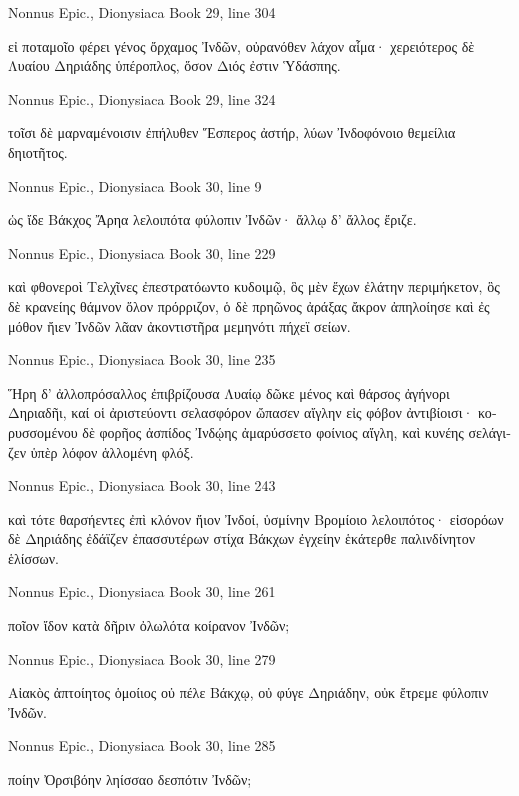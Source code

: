 \documentclass[12pt,letterpaper,twoside,final]{memoir}
\begin{document}
\begin{greek}
Nonnus Epic., Dionysiaca 
Book 29, line 304

                εἰ ποταμοῖο φέρει γένος ὄρχαμος Ἰνδῶν, 
οὐρανόθεν λάχον αἷμα· χερειότερος δὲ Λυαίου 
Δηριάδης ὑπέροπλος, ὅσον Διός ἐστιν Ὑδάσπης. 



Nonnus Epic., Dionysiaca 
Book 29, line 324

τοῖσι δὲ μαρναμένοισιν ἐπήλυθεν Ἕσπερος ἀστήρ, 
λύων Ἰνδοφόνοιο θεμείλια δηιοτῆτος. 



Nonnus Epic., Dionysiaca 
Book 30, line 9

ὡς ἴδε Βάκχος Ἄρηα λελοιπότα φύλοπιν Ἰνδῶν· 
ἄλλῳ δ' ἄλλος ἔριζε. 



Nonnus Epic., Dionysiaca 
Book 30, line 229

καὶ φθονεροὶ Τελχῖνες ἐπεστρατόωντο κυδοιμῷ, 
ὃς μὲν ἔχων ἐλάτην περιμήκετον, ὃς δὲ κρανείης 
θάμνον ὅλον πρόρριζον, ὁ δὲ πρηῶνος ἀράξας 
ἄκρον ἀπηλοίησε καὶ ἐς μόθον ἤιεν Ἰνδῶν 
λᾶαν ἀκοντιστῆρα μεμηνότι πήχεϊ σείων. 



Nonnus Epic., Dionysiaca 
Book 30, line 235

Ἥρη δ' ἀλλοπρόσαλλος ἐπιβρίζουσα Λυαίῳ 
δῶκε μένος καὶ θάρσος ἀγήνορι Δηριαδῆι, 
καί οἱ ἀριστεύοντι σελασφόρον ὤπασεν αἴγλην 
εἰς φόβον ἀντιβίοισι· κορυσσομένου δὲ φορῆος 
ἀσπίδος Ἰνδῴης ἀμαρύσσετο φοίνιος αἴγλη, 
καὶ κυνέης σελάγιζεν ὑπὲρ λόφον ἁλλομένη φλόξ. 



Nonnus Epic., Dionysiaca 
Book 30, line 243

καὶ τότε θαρσήεντες ἐπὶ κλόνον ἤιον Ἰνδοί, 
ὑσμίνην Βρομίοιο λελοιπότος· εἰσορόων δὲ 
Δηριάδης ἐδάϊζεν ἐπασσυτέρων στίχα Βάκχων 
ἐγχείην ἑκάτερθε παλινδίνητον ἑλίσσων. 



Nonnus Epic., Dionysiaca 
Book 30, line 261

ποῖον ἴδον κατὰ δῆριν ὀλωλότα κοίρανον Ἰνδῶν; 



Nonnus Epic., Dionysiaca 
Book 30, line 279

Αἰακὸς ἀπτοίητος ὁμοίιος οὐ πέλε Βάκχῳ, 
οὐ φύγε Δηριάδην, οὐκ ἔτρεμε φύλοπιν Ἰνδῶν. 



Nonnus Epic., Dionysiaca 
Book 30, line 285

ποίην Ὀρσιβόην ληίσσαο δεσπότιν Ἰνδῶν; 




\end{greek}
\end{document}
